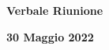 \begin{center}
  \Huge\textbf{Verbale Riunione}
\end{center}

\begin{center}
  \LARGE\textbf{30 Maggio 2022}
\end{center}

\bigskip
\bigskip
\bigskip
